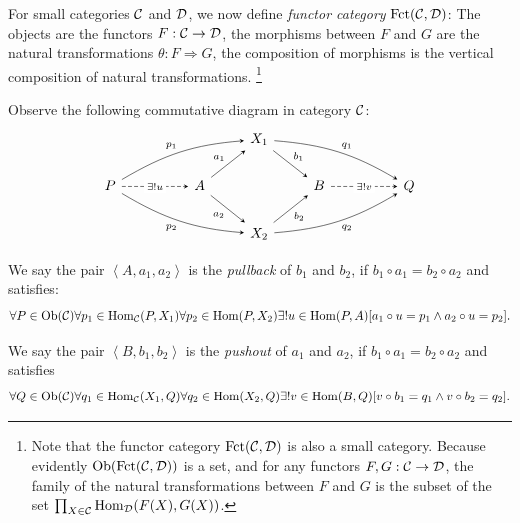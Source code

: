 \documentclass{article}
\begin{document}
\begin{defi}
	For small categories $\mathcal{C}$ and $\mathcal{D}$, we now define \emph{functor category} $\mathrm{Fct}(\mathcal{C},\mathcal{D})$: The objects are the functors $F:\mathcal{C}\to\mathcal{D}$, the morphisms between $F$ and $G$ are the natural transformations $\theta:F\Rightarrow G$, the composition of morphisms is the vertical composition of natural transformations.
		\footnote{Note that the functor category $\mathrm{Fct}(\mathcal{C},\mathcal{D})$ is also a small category. Because evidently $\mathrm{Ob}(\mathrm{Fct}(\mathcal{C},\mathcal{D}))$ is a set, and for any functors $F,G:\mathcal{C}\to\mathcal{D}$, the family of the natural transformations between $F$ and $G$ is the subset of the set $\prod_{X\in\mathcal{C}}{\mathrm{Hom}_{\mathcal{D}}(F(X),G(X))}$.}
\end{defi}


\begin{defi}
	Observe the following commutative diagram in category $\mathcal{C}$:
	\[\begin{tikzcd}
		& & & X_1 \arrow[->,>=stealth,rd, "b_1"] \arrow[->,>=stealth,rrrd, "q_1", bend left=13] & & & \\
		P \arrow[->,>=stealth,rrru, "p_1", bend left=13] \arrow[->,>=stealth,rrrd, "p_2"', bend right=13] \arrow[->,>=stealth,rr, "\exists!u" description, dashed] & &
		A \arrow[->,>=stealth,ru, "a_1"] \arrow[->,>=stealth,rd, "a_2"'] & & B \arrow[->,>=stealth,rr, "\exists!v" description, dashed] & & Q \\ & & &
		X_2 \arrow[->,>=stealth,ru, "b_2"'] \arrow[->,>=stealth,rrru, "q_2"', bend right=13] & & &
	\end{tikzcd}\]
	
	We say the pair $\left<A,a_1,a_2\right>$ is the \emph{pullback} of $b_1$ and $b_2$, if $b_1\circ a_1=b_2\circ a_2$ and satisfies:
		$$\forall P\in\mathrm{Ob}(\mathcal{C})\forall p_1\in\mathrm{Hom}_{\mathcal{C}}(P,X_1)\forall p_2\in\mathrm{Hom}(P,X_2)\exists!u\in\mathrm{Hom}(P,A)[a_1\circ u=p_1\wedge a_2\circ u=p_2].$$
	
	We say the pair $\left<B,b_1,b_2\right>$ is the \emph{pushout} of $a_1$ and $a_2$, if $b_1\circ a_1=b_2\circ a_2$ and satisfies
		$$\forall Q\in\mathrm{Ob}(\mathcal{C})\forall q_1\in\mathrm{Hom}_{\mathcal{C}}(X_1,Q)\forall q_2\in\mathrm{Hom}(X_2,Q)\exists!v\in\mathrm{Hom}(B,Q)[v\circ b_1=q_1\wedge v\circ b_2=q_2].$$
\end{defi}
\end{document}
